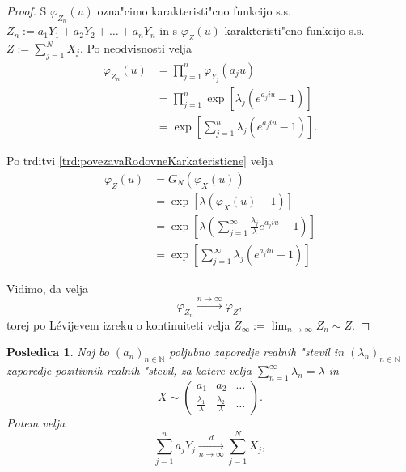 \documentclass[12pt, a4paper, reqno]{amsart}
\theoremstyle{definition}
\theoremstyle{plain}
\newtheorem{posledica}[definicija]{Posledica}
\newcommand{\N}{\mathbb{N}}
\newcommand{\1}{\mathds{1}}
\begin{document}
    \begin{proof}
        S $\varphi_{Z_n}(u)$ ozna"cimo karakteristi"cno funkcijo s.s.\ 
        $Z_n := a_1Y_1 + a_2Y_2 + \dots + a_nY_n$ in s $\varphi_{Z}(u)$ karakteristi"cno funkcijo s.s.\
        $Z:= \sum_{j=1}^{N}X_j$. Po neodvisnosti velja
        \begin{align*}
            \varphi_{Z_n}(u) 
                    &= \prod_{j=1}^{n}\varphi_{Y_j}(a_ju)\\
                    &= \prod_{j=1}^{n}\exp\left[\lambda_j\left(e^{a_j i u} - 1\right)\right] \\
                    &= \exp\left[\sum_{j=1}^{n}\lambda_j\left(e^{a_j i u} - 1\right)\right].
        \end{align*}

        \noindent
        Po trditvi \ref{trd:povezavaRodovneKarkateristicne} velja
        \begin{align*}
            \varphi_{Z}(u) 
                    &= G_N\left(\varphi_X(u)\right) \\
                    &= \exp\left[\lambda\left(\varphi_X(u) - 1\right)\right] \\
                    & = \exp\left[\lambda\left(\sum_{j=1}^\infty\frac{\lambda_j}{\lambda}e^{a_jiu} - 1\right)\right]\\
                    &= \exp\left[\sum_{j=1}^{\infty}\lambda_j\left(e^{a_j i u} - 1\right)\right]
        \end{align*}

        \noindent 
        Vidimo, da velja%
        \begin{equation*}
            \varphi_{Z_n} \xrightarrow{n\to\infty}\varphi_Z,
        \end{equation*}
        torej po Lévijevem izreku o kontinuiteti velja $Z_\infty :=\lim_{n\to\infty}Z_n \sim Z$.
    \end{proof}

    \begin{posledica}
        Naj bo $(a_n)_{n\in\N}$ poljubno zaporedje realnih "stevil in $(\lambda_n)_{n\in\N}$ zaporedje 
        pozitivnih realnih "stevil, za katere velja $\sum_{n=1}^\infty\lambda_n = \lambda$ in 
        \begin{equation*}
            X\sim
            \begin{pmatrix}
                a_1 & a_2 &  \dots \\
                \tfrac{\lambda_1}{\lambda} & \tfrac{\lambda_2}{\lambda} & \dots
            \end{pmatrix}.
        \end{equation*}
        Potem velja
        \begin{equation*}
            \sum_{j=1}^{n}a_jY_j \xrightarrow[n\to\infty]{d}\sum_{j=1}^NX_j,
        \end{equation*}
        \label{pos:NXjeEnakoaYstevno}
    \end{posledica}
\end{document}
